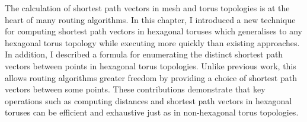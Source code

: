 		The calculation of shortest path vectors in mesh and torus topologies is at
		the heart of many routing algorithms. In this chapter, I introduced a new
		technique for computing shortest path vectors in hexagonal toruses which
		generalises to any hexagonal torus topology while executing more quickly
		than existing approaches. In addition, I described a formula for
		enumerating the distinct shortest path vectors between points in hexagonal
		torus topologies. Unlike previous work, this allows routing algorithms
		greater freedom by providing a choice of shortest path vectors between some
		points.  These contributions demonstrate that key operations such as
		computing distances and shortest path vectors in hexagonal toruses can be
		efficient and exhaustive just as in non-hexagonal torus topologies.
